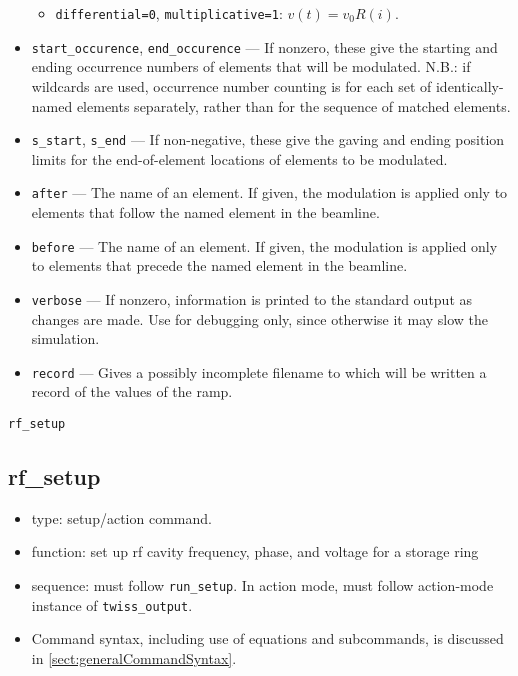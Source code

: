 \documentclass[11pt]{article}
\begin{document}
\begin{itemize}
\begin{itemize}
    \item \verb|differential=0|, \verb|multiplicative=1|: $v(t) = v_0 R(i)$.  
  \end{itemize}
\item \verb|start_occurence|, \verb|end_occurence| --- If nonzero, these give the starting and
 ending occurrence numbers of elements that will be modulated. N.B.: if wildcards are used, occurrence
 number counting is for each set of identically-named elements separately, rather than for the sequence
 of matched elements.
\item \verb|s_start|, \verb|s_end| --- If non-negative, these give the gaving and ending position
 limits for the end-of-element locations of elements to be modulated.
\item \verb|after| --- The name of an element.  If given, the modulation is applied only to elements
 that follow the named element in the beamline.  
\item \verb|before| --- The name of an element.  If given, the modulation is applied only to elements
 that precede the named element in the beamline. 
\item \verb|verbose| --- If nonzero, information is printed to the standard output as changes are
        made.  Use for debugging only, since otherwise it may slow the simulation.
\item \verb|record| --- Gives a possibly incomplete filename to which will be written a record of the values of
  the ramp.
\end{itemize}

\newpage
\begin{center}{\Large\verb|rf_setup|}\end{center}
\subsection{rf\_setup\label{subsec:rfsetup}}

\begin{itemize}
\item type: setup/action command.
\item function: set up rf cavity frequency, phase, and voltage for a storage ring
\item sequence: must follow \verb|run_setup|. In action mode, must follow action-mode instance of \verb|twiss_output|.
\item Command syntax, including use of equations and subcommands, is discussed in \ref{sect:generalCommandSyntax}.
\end{itemize}
\end{document}
